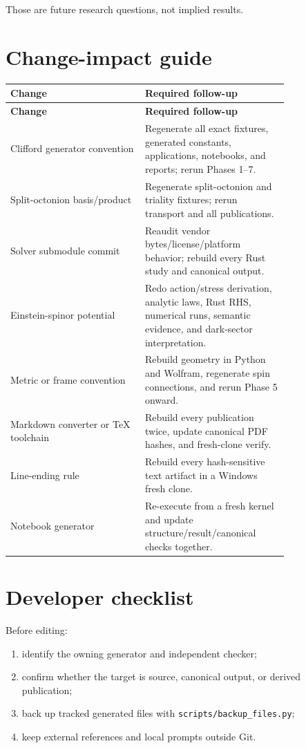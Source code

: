 \documentclass[11pt]{article}
\begin{document}
Those are future research questions, not implied results.

\section{Change-impact guide}

\begingroup
\small
\begin{longtable}{@{}>{\raggedright\arraybackslash}p{0.400\linewidth}>{\raggedright\arraybackslash}p{0.400\linewidth}@{}}
\toprule
\textbf{Change} & \textbf{Required follow-up} \\
\midrule
\endfirsthead
\toprule
\textbf{Change} & \textbf{Required follow-up} \\
\midrule
\endhead
Clifford generator convention & Regenerate all exact fixtures, generated constants, applications, notebooks, and reports; rerun Phases 1--7. \\
Split-octonion basis/product & Regenerate split-octonion and triality fixtures; rerun transport and all publications. \\
Solver submodule commit & Reaudit vendor bytes/license/platform behavior; rebuild every Rust study and canonical output. \\
Einstein-spinor potential & Redo action/stress derivation, analytic laws, Rust RHS, numerical runs, semantic evidence, and dark-sector interpretation. \\
Metric or frame convention & Rebuild geometry in Python and Wolfram, regenerate spin connections, and rerun Phase 5 onward. \\
Markdown converter or TeX toolchain & Rebuild every publication twice, update canonical PDF hashes, and fresh-clone verify. \\
Line-ending rule & Rebuild every hash-sensitive text artifact in a Windows fresh clone. \\
Notebook generator & Re-execute from a fresh kernel and update structure/result/canonical checks together. \\
\bottomrule
\end{longtable}
\endgroup

\section{Developer checklist}

Before editing:

\begin{enumerate}
\item identify the owning generator and independent checker;
\item confirm whether the target is source, canonical output, or derived
publication;

\item back up tracked generated files with \texttt{scripts/\allowbreak{}backup\_f\allowbreak{}iles.py};
\item keep external references and local prompts outside Git.
\end{enumerate}
\end{document}
